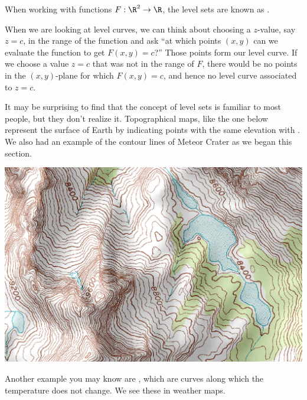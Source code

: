 \documentclass{ximera}
\begin{document}
When working with functions $F:\R^2\to\R$, the level sets are known as
.

When we are looking at level curves, we can think about choosing
a $z$-value, say $z=c$, in the range of the function and ask ``at
which points $(x,y)$ can we evaluate the function to get $F(x,y)=c$?''
Those points form our level curve.    If we choose a value $z=c$ 
that was not in the range of $F$, there would be no points in the 
$(x,y)$-plane for which $F(x,y)=c$, and hence no level curve 
associated to $z = c$.



It may be surprising to find that the concept of level sets is
familiar to most people, but they don't realize it.  Topographical
maps, like the one below represent the surface of Earth by
indicating points with the same elevation with .  We also had an example of the contour lines of Meteor 
  Crater as we began this section.

\begin{image}%
  \includegraphics{topomap.jpg}
\end{image}

Another example you may know are , which are curves along which the
temperature does not change. We see these in weather maps.
\end{document}
